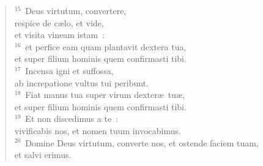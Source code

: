 \begin{flushleft}
\begin{verse}
${}^{15}$~Deus virtutum, convertere,\\ respice de c\ae lo, et vide,\\ et visita vineam istam~:\\
${}^{16}$~et perfice eam quam plantavit dextera tua,\\ et super filium hominis quem confirmasti tibi.\\
${}^{17}$~Incensa igni et suffossa,\\ ab increpatione vultus tui peribunt.\\
${}^{18}$~Fiat manus tua super virum dexter\ae\ tu\ae ,\\ et super filium hominis quem confirmasti tibi.\\
${}^{19}$~Et non discedimus a te~:\\ vivificabis nos, et nomen tuum invocabimus.\\
${}^{20}$~Domine Deus virtutum, converte nos, et ostende faciem tuam,\\ et salvi erimus.\end{verse}\end{flushleft}


